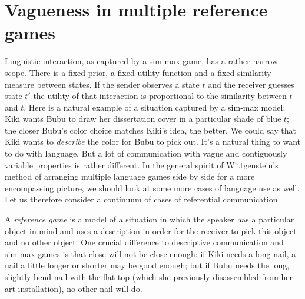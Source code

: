 \documentclass[a4paper]{article}
\begin{document}
\section{Vagueness in multiple reference games}
\label{sec:referential-vagueness}

Linguistic interaction, as captured by a sim-max game, has a rather narrow scope. There is a fixed prior, a fixed utility function and a fixed similarity measure between states. If the sender observes a state $t$ and the receiver guesses state $t'$ the utility of that interaction is proportional to the similarity between $t$ and $t$. Here is a natural example of  a situation captured by a sim-max model: Kiki wants Bubu to draw her dissertation cover in a particular shade of blue $t$; the closer Bubu's color choice matches Kiki's idea, the better. We could say that Kiki wants to \emph{describe} the color for Bubu to pick out. It's a natural thing to want to do with language. But a lot of communication with vague and contiguously variable properties is rather different. In the general spirit of Wittgenstein's method of arranging multiple language games side by side for a more encompassing picture, we should look at some more cases of language use as well. Let us therefore consider a continuum of cases of referential communication.

A \emph{reference game} is a model of a situation in which the speaker has a particular object in mind and uses a description in order for the receiver to pick this object and no other object. One crucial difference to descriptive communication and sim-max games is that close will not be close enough: if Kiki needs a long nail, a nail a little longer or shorter may be good enough; but if Bubu needs the long, slightly bend nail with the flat top (which she previously disassembled from her art installation), no other nail will do. 
\end{document}

